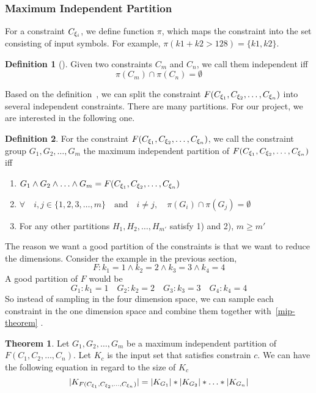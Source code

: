 \subsubsection{Maximum Independent Partition}

For a constraint $C_{{\xi}_{i}}$, we define function $\pi$, which maps
the constraint into the set consisting of input symbols. For example, 
$\pi(k1 + k2 > 128) = \{k1, k2\}$.

\theoremstyle{definition}
\newtheorem{definition}{Definition}[section]

\begin{definition}[]
      \label{independentC}
      Given two constraints $C_m$ and $C_n$, we call them independent iff 
      $$\pi(C_m) \cap \pi(C_n) = \emptyset$$
\end{definition}

Based on the definition~\label{independentC}, we can split
the constraint $F(C_{{\xi}_{1}},C_{{\xi}_{2}},\ldots,C_{{\xi}_{n}})$ into several 
independent constraints. There are many partitions. For our project, 
we are interested in the following one.

\begin{definition}\label{Goodpartition}
   For the constraint $F(C_{{\xi}_{1}},C_{{\xi}_{2}},\ldots,C_{{\xi}_{n}})$,
   we call the constraint group
   $G_{1}, G_{2}, \ldots, G_{m}$
   the maximum independent partition of $F(C_{{\xi}_{1}},C_{{\xi}_{2}},\ldots,C_{{\xi}_{n}})$ iff
   \begin{enumerate}
      \item $G_{1} \land G_{2} \land \ldots \land G_{m} = F(C_{{\xi}_{1}},C_{{\xi}_{2}},\ldots,C_{{\xi}_{n}})$
      \item $\forall \quad i, j \in \{1, 2, 3, \ldots, m\} \quad \textrm{and} \quad 
            i \neq j, \quad \pi(G_{i}) \cap \pi(G_{j}) = \emptyset $
      \item For any other partitions  $H_{1}, H_{2}, \ldots, H_{m'}$ satisfy 1) and
            2), $m \geq m'$    
   \end{enumerate}
   
\end{definition}

The reason we want a good partition of the constraints is that we want to 
reduce the dimensions. Consider the example in the previous section,
$$F: {k_1} = 1\land{k_2} = 2\land{k_3} = 3\land{k_4} = 4$$
A good partition of $F$ would be
$$G_{1}: {k_1} = 1\quad G_{2}: {k_2} = 2\quad G_{3}: {k_3} = 3\quad G_{4}: {k_4} = 4$$     
So instead of sampling in the four dimension space, we can
sample each constraint in the one dimension space and combine them
together with~\ref{mip-theorem} .
\newtheorem{theorem}{Theorem}[section]
\label{mip-theorem}
\begin{theorem}
      \label{IndependentConstraint}
Let $G_{1}, G_{2}, \ldots, G_{m}$ be a maximum independent partition of $F(C_1,C_2,\ldots,C_n)$.
Let $K_c$ is the input set that satisfies constrain $c$. We can have the following
equation in regard to the size of $K_c$
$$|K_{F(C_{{\xi}_{1}},C_{{\xi}_{2}},\ldots,C_{{\xi}_{n}})}| = |K_{G_{1}}|*|K_{G_{2}}|*\ldots*|K_{G_{n}}|$$
\end{theorem}

